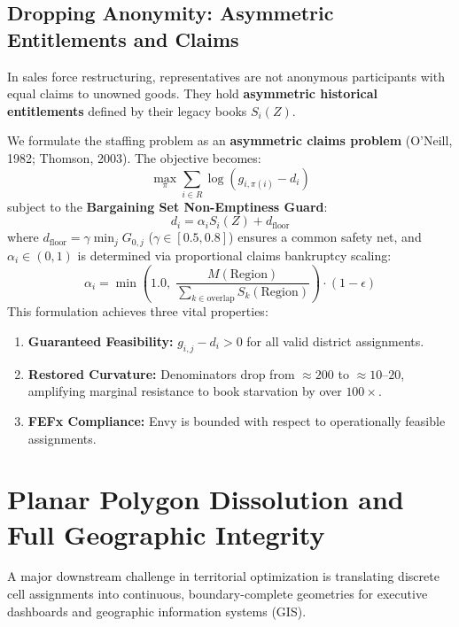\documentclass[11pt,a4paper]{article}
\theoremstyle{plain}
\theoremstyle{definition}
\begin{document}
\subsection{Dropping Anonymity: Asymmetric Entitlements and Claims}
In sales force restructuring, representatives are not anonymous participants with equal claims to unowned goods. They hold \textbf{asymmetric historical entitlements} defined by their legacy books $S_i(Z)$. 

We formulate the staffing problem as an \textbf{asymmetric claims problem} (O'Neill, 1982; Thomson, 2003). The objective becomes:
\begin{equation}
    \max_{\pi} \sum_{i \in R} \log\left( g_{i, \pi(i)} - d_i \right)
\end{equation}
subject to the \textbf{Bargaining Set Non-Emptiness Guard}:
\begin{equation}
    d_i = \alpha_i S_i(Z) + d_{\text{floor}}
\end{equation}
where $d_{\text{floor}} = \gamma \min_j G_{0,j}$ ($\gamma \in [0.5, 0.8]$) ensures a common safety net, and $\alpha_i \in (0, 1)$ is determined via proportional claims bankruptcy scaling:
\begin{equation}
    \alpha_i = \min\left( 1.0, \; \frac{M(\text{Region})}{\sum_{k \in \text{overlap}} S_k(\text{Region})} \right) \cdot (1 - \epsilon)
\end{equation}
This formulation achieves three vital properties:
\begin{enumerate}[leftmargin=1.5em]
    \item \textbf{Guaranteed Feasibility:} $g_{i,j} - d_i > 0$ for all valid district assignments.
    \item \textbf{Restored Curvature:} Denominators drop from $\approx 200$ to $\approx 10\text{--}20$, amplifying marginal resistance to book starvation by over $100\times$.
    \item \textbf{FEFx Compliance:} Envy is bounded with respect to operationally feasible assignments.
\end{enumerate}

\section{Planar Polygon Dissolution and Full Geographic Integrity}

A major downstream challenge in territorial optimization is translating discrete cell assignments into continuous, boundary-complete geometries for executive dashboards and geographic information systems (GIS).
\end{document}
